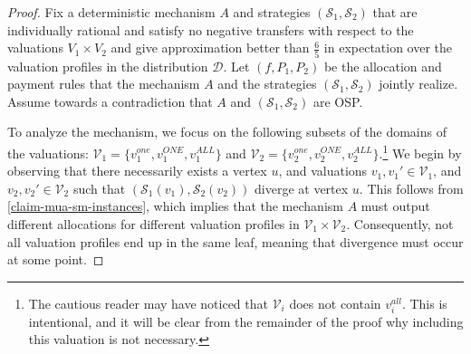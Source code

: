 \begin{proof}
Fix a deterministic mechanism $A$ and strategies
$(\mathcal S_1,\mathcal S_2)$ that are individually rational and satisfy no negative transfers with respect to the valuations $V_1\times V_2$ 
and give approximation better than $\frac{6}{5}$
in expectation over the valuation profiles in the distribution $\mathcal D$. 
Let  $(f,P_1,P_2)$ be the allocation and payment rules that the mechanism $A$ and the strategies $(\mathcal S_1,\mathcal S_2)$ jointly realize. Assume towards a contradiction that $A$ and $(\mathcal S_1,\mathcal S_2)$ are OSP. 



To analyze the mechanism, we focus on the following subsets of the domains of the valuations:
$
\mathcal{V}_1=\{v_1^{one},v_1^{ONE},v_1^{ALL}\}$ and  $\mathcal{V}_2=\{v_2^{one},v_2^{ONE},v_2^{ALL}\}$.\footnote{The cautious reader may have noticed that $\mathcal V_i$ does not contain  $v_i^{all}$. This is intentional, and it will be clear from the remainder of the proof why including this valuation is not necessary.} 
We begin by observing that there necessarily exists a vertex $u$, and valuations $v_1,v_1' \in \mathcal{V}_1$, and  $v_2,v_2' \in \mathcal{V}_2$ such that $(\mathcal{S}_1(v_1), \mathcal{S}_2(v_2))$ diverge at vertex $u$. This follows from \cref{claim-mua-sm-instances}, which implies that the mechanism $A$ must output different allocations for different valuation profiles in $\mathcal{V}_1 \times \mathcal{V}_2$. Consequently, not all valuation profiles end up in the same leaf, meaning that divergence must occur at some point. 
 

\end{proof}
